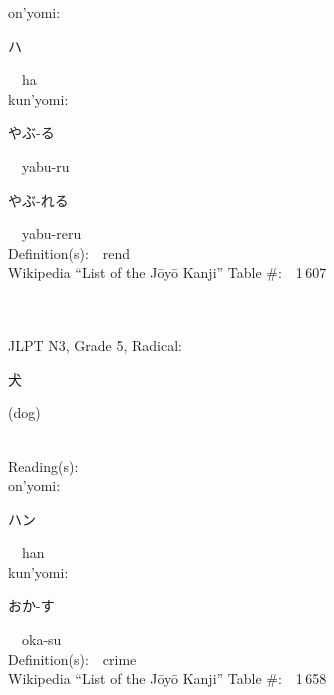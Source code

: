 \begin{multicols}{2}
{\hspace*{1em}}on'yomi:\ \ \\
{\hspace*{2em}}{\begin{CJK}{UTF8}{min} ハ \end{CJK}}\ \ ha\ \ \\
{\hspace*{1em}}kun'yomi:\ \ \\
{\hspace*{2em}}{\begin{CJK}{UTF8}{min} やぶ-る \end{CJK}}\ \ yabu-ru\ \ \\
{\hspace*{2em}}{\begin{CJK}{UTF8}{min} やぶ-れる \end{CJK}}\ \ yabu-reru\ \ \\
Definition(s):\ \ rend \\
Wikipedia ``List of the J\=oy\=o Kanji'' Table \#:\ \ 1\,607 \\
\ \ \\
{\fontsize{34pt}{40pt}  }\ \ \\  %
{JLPT N3, Grade 5, Radical:\ \ {\begin{CJK}{UTF8}{min} 犬 \end{CJK}} (dog) } \\
Reading(s):\ \ \\
{\hspace*{1em}}on'yomi:\ \ \\
{\hspace*{2em}}{\begin{CJK}{UTF8}{min} ハン \end{CJK}}\ \ han\ \ \\
{\hspace*{1em}}kun'yomi:\ \ \\
{\hspace*{2em}}{\begin{CJK}{UTF8}{min} おか-す \end{CJK}}\ \ oka-su\ \ \\
Definition(s):\ \ crime \\
Wikipedia ``List of the J\=oy\=o Kanji'' Table \#:\ \ 1\,658 \\
\ \ \\
{\fontsize{34pt}{40pt}  }\ \ \\  %

\end{multicols}
